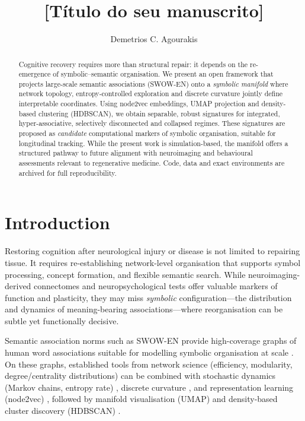 \documentclass[fleqn,10pt]{wlscirep}
\title{[Título do seu manuscrito]}
\author[1]{Demetrios C. Agourakis}
\affil[1]{[Instituição], [Cidade], [País]}
\date{} %
\begin{document}
\begin{abstract}
Cognitive recovery requires more than structural repair: it depends on the re-emergence of symbolic--semantic organisation. We present an open framework that projects large-scale semantic associations (SWOW-EN) onto a \emph{symbolic manifold} where network topology, entropy-controlled exploration and discrete curvature jointly define interpretable coordinates. Using node2vec embeddings, UMAP projection and density-based clustering (HDBSCAN), we obtain separable, robust signatures for integrated, hyper-associative, selectively disconnected and collapsed regimes. These signatures are proposed as \emph{candidate} computational markers of symbolic organisation, suitable for longitudinal tracking. While the present work is simulation-based, the manifold offers a structured pathway to future alignment with neuroimaging and behavioural assessments relevant to regenerative medicine. Code, data and exact environments are archived for full reproducibility.
\end{abstract}

\flushbottom
\maketitle
\thispagestyle{empty}

\section*{Introduction}
Restoring cognition after neurological injury or disease is not limited to repairing tissue. It requires re-establishing network-level organisation that supports symbol processing, concept formation, and flexible semantic search. While neuroimaging-derived connectomes and neuropsychological tests offer valuable markers of function and plasticity, they may miss \textit{symbolic} configuration---the distribution and dynamics of meaning-bearing associations---where reorganisation can be subtle yet functionally decisive.

Semantic association norms such as SWOW-EN provide high-coverage graphs of human word associations suitable for modelling symbolic organisation at scale \cite{DeDeyne2019}. On these graphs, established tools from network science (efficiency, modularity, degree/centrality distributions) \cite{Newman2010Networks,Watts1998Nature,Latora2001PRL} can be combined with stochastic dynamics (Markov chains, entropy rate) \cite{Shannon1948,Burda2009PNAS}, discrete curvature \cite{Ollivier2009,Forman2003}, and representation learning (node2vec) \cite{Grover2016node2vec}, followed by manifold visualisation (UMAP) \cite{McInnes2018UMAP} and density-based cluster discovery (HDBSCAN) \cite{Campello2015}. 
\end{document}
